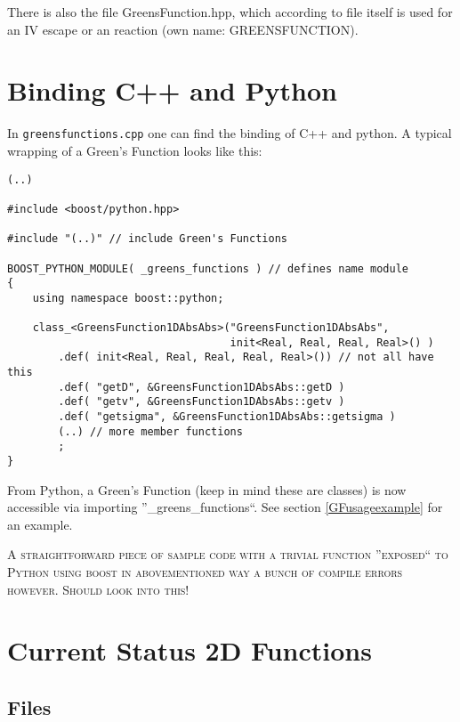 \documentclass[a4paper,10pt]{article}
\begin{document}
There is also the file GreensFunction.hpp, which according to file itself is used for an IV escape or an reaction (own name: GREENSFUNCTION).

\section{Binding C++ and Python}
 
In \texttt{greensfunctions.cpp} one can find the binding of C++ and python. A typical wrapping of a Green's Function looks like this:

\begin{verbatim}
(..)

#include <boost/python.hpp>

#include "(..)" // include Green's Functions

BOOST_PYTHON_MODULE( _greens_functions ) // defines name module
{
    using namespace boost::python;

    class_<GreensFunction1DAbsAbs>("GreensFunction1DAbsAbs",
                                   init<Real, Real, Real, Real>() )
        .def( init<Real, Real, Real, Real, Real>()) // not all have this
        .def( "getD", &GreensFunction1DAbsAbs::getD )
        .def( "getv", &GreensFunction1DAbsAbs::getv )
        .def( "getsigma", &GreensFunction1DAbsAbs::getsigma )
        (..) // more member functions
        ;
}
\end{verbatim} 
 
From Python, a Green's Function (keep in mind these are classes) is now accessible via importing ''\_greens\_functions``. See section \ref{GFusageexample} for an example.

\bigskip 

\textsc{A straightforward piece of sample code with a trivial function ''exposed`` to Python using boost in abovementioned way a bunch of compile errors however. Should look into this!}

\section{Current Status 2D Functions}

\subsection{Files}
\end{document}
